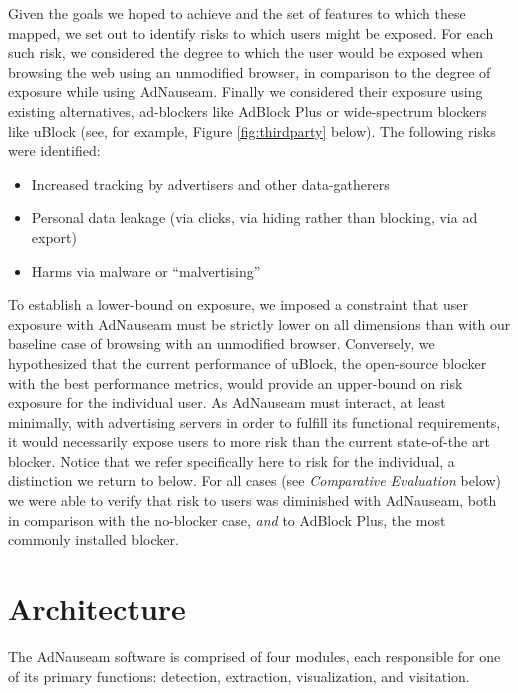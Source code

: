 \documentclass[conference]{IEEEtran}
\begin{document}
Given the goals we hoped to achieve and the set of features to which these mapped, we set out to identify risks to which users might be exposed. For each such risk, we considered the degree to which the user would be exposed when browsing the web using an unmodified browser, in comparison to the degree of exposure while using AdNauseam. Finally we considered their exposure using existing alternatives, ad-blockers like AdBlock Plus \cite{AdBlock} or wide-spectrum blockers like uBlock \cite{Gorhill}(see, for example, Figure \ref{fig:thirdparty} below). The following risks were identified:

\vspace{2mm}
\begin{itemize}
\item Increased tracking by advertisers and other data-gatherers
\item Personal data leakage (via clicks, via hiding rather than blocking, via ad export)
\item Harms via malware or “malvertising”
\end{itemize}
\vspace{1mm}


\noindent To establish a lower-bound on exposure, we imposed a constraint that user exposure with AdNauseam must be strictly lower on all dimensions than with our baseline case of browsing with an unmodified browser. Conversely, we hypothesized that the current performance of uBlock, the open-source blocker with the best performance metrics, would provide an upper-bound on risk exposure for the individual user. As AdNauseam must interact, at least minimally, with advertising servers in order to fulfill its functional requirements, it would necessarily expose users to more risk than the current state-of-the art blocker. Notice that we refer specifically here to risk for the individual, a distinction we return to below. For all cases (see \emph{Comparative Evaluation} below) we were able to verify that risk to users was diminished with AdNauseam, both in comparison with the no-blocker case, \emph{and} to AdBlock Plus, the most commonly installed blocker\cite{PageFair}.

\section{Architecture}

The AdNauseam software is comprised of four modules, each responsible for one of its primary functions: detection, extraction, visualization, and visitation.
\end{document}
